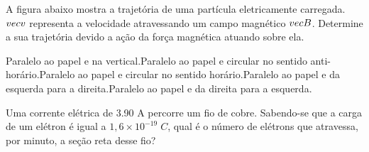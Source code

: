 \documentclass[12pt, addpoints]{exam}
\begin{document}
        \begin{questions}
\begin{multicols*}{2}
\question[20] A ﬁgura abaixo mostra a trajetória de uma partícula eletricamente carregada. $\\vec{{v}}$ representa a velocidade atravessando um campo magnético $\\vec{{B}}$. Determine a sua trajetória devido a ação da força magnética atuando sobre ela.
        
        \begin{center}
            \begin{minipage}[c]{0.5\linewidth}
            \end{minipage}
        \end{center}

        

\begin{choices}
\choice Paralelo ao papel e na vertical.\choice Paralelo ao papel e circular no sentido anti-horário.\choice Paralelo ao papel e circular no sentido horário.\choice Paralelo ao papel e da esquerda para a direita.\choice Paralelo ao papel e da direita para a esquerda.\end{choices}
\question[20] Uma corrente elétrica de    3.90 A percorre um ﬁo de cobre. Sabendo-se que a carga de um elétron é igual a $1,6\times 10^{-19}\;C$, qual é o número de elétrons que atravessa, por minuto, a seção reta desse ﬁo?


\end{multicols*}
\end{questions}
\end{document}
